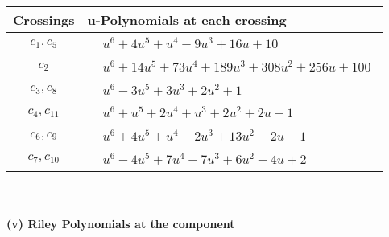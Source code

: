 \documentclass[1p]{elsarticle_modified}
\theoremstyle{definition}
\begin{document}
\begin{tabular}{m{50pt}|m{274pt}}
Crossings & \hspace{64pt}u-Polynomials at each crossing \\
\hline $$\begin{aligned}c_{1},c_{5}\end{aligned}$$&$\begin{aligned}
&u^6+4 u^5+u^4-9 u^3+16 u+10
\end{aligned}$\\
\hline $$\begin{aligned}c_{2}\end{aligned}$$&$\begin{aligned}
&u^6+14 u^5+73 u^4+189 u^3+308 u^2+256 u+100
\end{aligned}$\\
\hline $$\begin{aligned}c_{3},c_{8}\end{aligned}$$&$\begin{aligned}
&u^6-3 u^5+3 u^3+2 u^2+1
\end{aligned}$\\
\hline $$\begin{aligned}c_{4},c_{11}\end{aligned}$$&$\begin{aligned}
&u^6+u^5+2 u^4+u^3+2 u^2+2 u+1
\end{aligned}$\\
\hline $$\begin{aligned}c_{6},c_{9}\end{aligned}$$&$\begin{aligned}
&u^6+4 u^5+u^4-2 u^3+13 u^2-2 u+1
\end{aligned}$\\
\hline $$\begin{aligned}c_{7},c_{10}\end{aligned}$$&$\begin{aligned}
&u^6-4 u^5+7 u^4-7 u^3+6 u^2-4 u+2
\end{aligned}$\\
\hline
\end{tabular}\\~\\
\newpage\renewcommand{\arraystretch}{1}
\flushleft \textbf{(v) Riley Polynomials at the component}\newline \\
\end{document}
